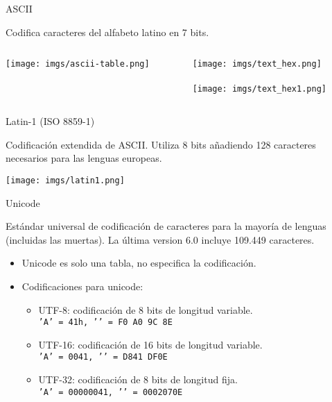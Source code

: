 \begin{frame}{ASCII}
    \begin{block}{}
        \centering Codifica caracteres del alfabeto latino en 7 bits.
    \end{block}
    \begin{columns}
    \begin{column}{0.40\textwidth}
        \texttt{[image: imgs/ascii-table.png]}
    \end{column}
    \begin{column}{0.55\textwidth}
        \centering
        \texttt{[image: imgs/text\_hex.png]} \\
        \Huge \textdownarrow \\
        \texttt{[image: imgs/text\_hex1.png]}
    \end{column}
    \end{columns}
\end{frame}

\begin{frame}{Latin-1 (ISO 8859-1)}
    \begin{block}{}
        Codificación extendida de ASCII. Utiliza 8 bits añadiendo 128 caracteres necesarios para las lenguas europeas.
    \end{block}
    \centering\texttt{[image: imgs/latin1.png]}
\end{frame}

\begin{frame}{Unicode}
    \begin{block}{}
        Estándar universal de codificación de caracteres para la mayoría de lenguas (incluidas las muertas). La última version 6.0 incluye 109.449 caracteres.
    \end{block}

    \begin{itemize}
        \item<2-> Unicode es solo una tabla, no especifica la codificación.
        \item<3-> Codificaciones para unicode:
        \begin{itemize}
            \item<4-> UTF-8: codificación de 8 bits de longitud variable.\\ \texttt{'A' = 41h, '}\texttt{' = F0 A0 9C 8E}
            \item<5-> UTF-16: codificación de 16 bits de longitud variable. \\ \texttt{'A' = 0041, '}\texttt{' = D841 DF0E}
            \item<6-> UTF-32: codificación de 8 bits de longitud fija. \\ \texttt{'A' = 00000041, '}\texttt{' = 0002070E}
        \end{itemize}
    \end{itemize}
\end{frame}

